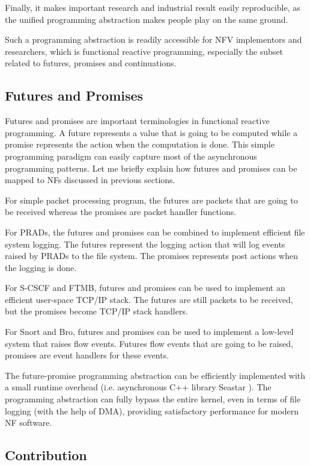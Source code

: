 Finally, it makes important research and industrial result easily reproducible,
as the unified programming abstraction makes people play on the same ground.

Such a programming abstraction is readily accessible for NFV implementors and
researchers, which is functional reactive programming, especially the subset
related to futures, promises and continuations.

\subsection{Futures and Promises}

Futures and promises are important terminologies in functional reactive
programming. A future represents a value that is going to be computed while a
promise represents the action when the computation is done. This simple
programming paradigm can easily capture most of the asynchronous programming
patterns. Let me briefly explain how futures and promises can be mapped to NFs
discussed in previous sections.

For simple packet processing program, the futures are packets that are going to
be received whereas the promises are packet handler functions.

For PRADs, the futures and promises can be combined to implement efficient file
system logging. The futures represent the logging action that will log events
raised by PRADs to the file system. The promises represents post actions when
the logging is done.

For S-CSCF and FTMB, futures and promises can be used to implement an efficient
user-space TCP/IP stack. The futures are still packets to be received, but the
promises become TCP/IP stack handlers.

For Snort and Bro, futures and promises can be used to implement a low-level
system that raises flow events. Futures flow events that are going to be raised,
promises are event handlers for these events.

The future-promise programming abstraction can be efficiently implemented with
a small runtime overhead (i.e. asynchronous C++ library Seastar
\cite{seastar}). The programming abstraction can fully bypass the entire kernel,
even in terms of file logging (with the help of DMA), providing satisfactory
performance for modern NF software.

\subsection{Contribution}

